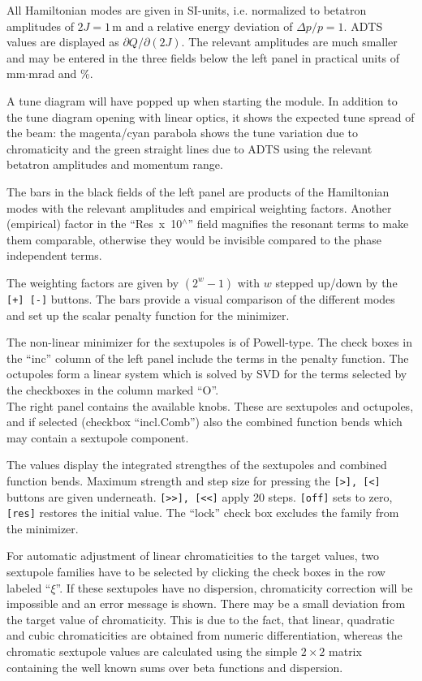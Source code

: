 \documentclass[12pt]{article}
\begin{document}
All Hamiltonian modes are given in SI-units, i.e. normalized to betatron amplitudes of $2J=1\,$m and a relative energy deviation of $\Delta p/p=1$. ADTS values are displayed as $\partial Q/\partial (2J)$. 
The relevant amplitudes are much smaller and may be entered in the three fields below the left panel in practical units of mm$\cdot$mrad and \%.

A tune diagram will have popped up when starting the module. In addition to the tune diagram opening with linear optics, it shows the expected tune spread of the beam: the magenta/cyan parabola shows the tune variation due to
chromaticity and the green straight lines due to ADTS using the relevant betatron amplitudes and momentum range.

The bars in the black fields of the left panel are products of the Hamiltonian modes with the relevant amplitudes and empirical weighting factors.
Another (empirical) factor in the ``Res~x~10$^{\wedge}$'' field magnifies the resonant terms to make them comparable, otherwise they would be invisible compared to the phase independent terms.

The weighting factors are given by $(2^w-1)$ with $w$ stepped up/down by
the {\tt [+] [-]} buttons. The bars provide a visual comparison of the different modes and set up the scalar penalty function for the minimizer. 

The non-linear minimizer for the sextupoles is of Powell-type.
The check boxes in the ``inc'' column of the left panel include the terms in the penalty function.
The octupoles form a linear system which is solved by SVD for the terms selected by the checkboxes in the column marked ``O''.\\

The right panel contains the available knobs. These are sextupoles and octupoles, and if selected (checkbox ``incl.Comb'') also the combined function bends which may contain a sextupole component.

The values display the integrated strengthes of the sextupoles and combined function bends.
Maximum strength and step size for pressing the {\tt [>], [<]} buttons are
given underneath. {\tt [>>], [<<]} apply 20 steps.
{\tt [off]} sets to zero, {\tt [res]} restores the initial value.
The ``lock'' check box excludes the family from the minimizer.

For automatic adjustment of linear chromaticities to the target values, two
sextupole families have to be selected by clicking the check boxes in the
row labeled ``$\xi$''. If these sextupoles have no dispersion, chromaticity
correction will be impossible and an error message is shown.
There may be a small deviation from the target value of chromaticity. This
is due to the fact, that linear, quadratic and cubic chromaticities are
obtained from numeric differentiation, whereas the chromatic sextupole
values are calculated using the simple $2\times 2$ matrix containing the well
known sums over beta functions and dispersion.
\end{document}
